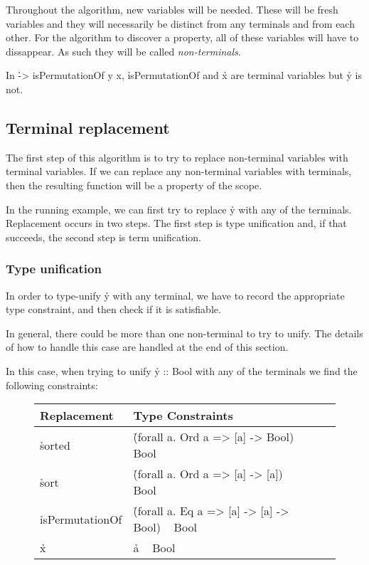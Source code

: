 \documentclass[a4paper, 11pt, onepage]{article}
\begin{document}
Throughout the algorithm, new variables will be needed.
These will be fresh variables and they will necessarily be distinct from any terminals and from each other.
For the algorithm to discover a property, all of these variables will have to dissappear.
As such they will be called \emph{non-terminals}.

\begin{ex}
  In \h{\x -> isPermutationOf y x}, \h{isPermutationOf} and \h{x} are terminal variables but \h{y} is not.
\end{ex}


\subsection{Terminal replacement}

The first step of this algorithm is to try to replace non-terminal variables with terminal variables.
If we can replace any non-terminal variables with terminals, then the resulting function will be a property of the scope.

In the running example, we can first try to replace \h{y} with any of the terminals.
Replacement occurs in two steps.
The first step is type unification and, if that succeeds, the second step is term unification.


\subsubsection{Type unification}

In order to type-unify \h{y} with any terminal, we have to record the appropriate type constraint, and then check if it is satisfiable.

In general, there could be more than one non-terminal to try to unify.
The details of how to handle this case are handled at the end of this section.

In this case, when trying to unify \h{y :: Bool} with any of the terminals we find the following constraints:

\begin{figure}[H]
  \centering
  \begin{tabular}{|l|l|l|}
    \hline
    Replacement & Type Constraints \\
    \hline
    \hline
    \h{sorted} & \h{(forall a. Ord a => [a] -> Bool) ~ Bool} \\
    \hline
    \h{sort} & \h{(forall a. Ord a => [a] -> [a]) ~ Bool} \\
    \hline
    \h{isPermutationOf} & \h{(forall a. Eq a => [a] -> [a] -> Bool) ~ Bool} \\
    \hline
    \h{x} & \h{a ~ Bool} \\
    \hline
  \end{tabular}
\end{figure}
\end{document}
